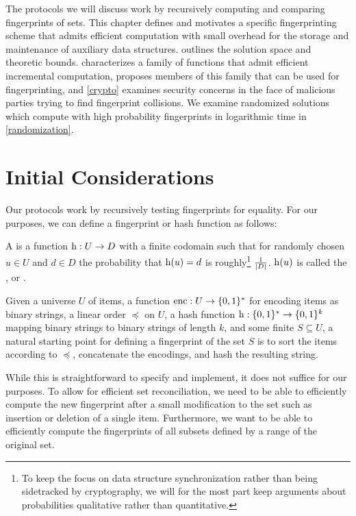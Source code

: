 
The protocols we will discuss work by recursively computing and comparing fingerprints of sets.
This chapter defines and motivates a specific fingerprinting scheme that admits efficient computation with small overhead for the storage and maintenance of auxiliary data structures.  outlines the solution space and theoretic bounds.  characterizes a family of functions that admit efficient incremental computation,  proposes members of this family that can be used for fingerprinting, and \cref{crypto} examines security concerns in the face of malicious parties trying to find fingerprint collisions. We examine randomized solutions which compute with high probability fingerprints in logarithmic time in \cref{randomization}.

\section{Initial Considerations}
\label{initial-considerations}

Our protocols work by recursively testing fingerprints for equality. For our purposes, we can define a fingerprint or hash function as follows:

\begin{definition}
A  is a function ${\operatorname{h}}: {U} \rightarrow {D}$ with a finite codomain such that for randomly chosen $u \in U$ and $d \in D$ the probability that $\operatorname{h}(u) = d$ is roughly\footnote{To keep the focus on data structure synchronization rather than being sidetracked by cryptography, we will for the most part keep arguments about probabilities qualitative rather than quantitative.} $\frac{1}{|{D}|}$. $\operatorname{h}(u)$ is called the ,  or .
\end{definition}

Given a universe $U$ of items, a function $\operatorname{enc} : U \rightarrow \{0, 1\}^{*}$ for encoding items as binary strings, a linear order $\preceq$ on $U$, a hash function $\operatorname{h}: \{0, 1\}^{*} \rightarrow \{0, 1\}^{k}$ mapping binary strings to binary strings of length $k$, and some finite $S \subseteq U$, a natural starting point for defining a fingerprint of the set $S$ is to sort the items according to $\preceq$, concatenate the encodings, and hash the resulting string.

While this is straightforward to specify and implement, it does not suffice for our purposes. To allow for efficient set reconciliation, we need to be able to efficiently compute the new fingerprint after a small modification to the set such as insertion or deletion of a single item. Furthermore, we want to be able to efficiently compute the fingerprints of all subsets defined by a range of the original set.


